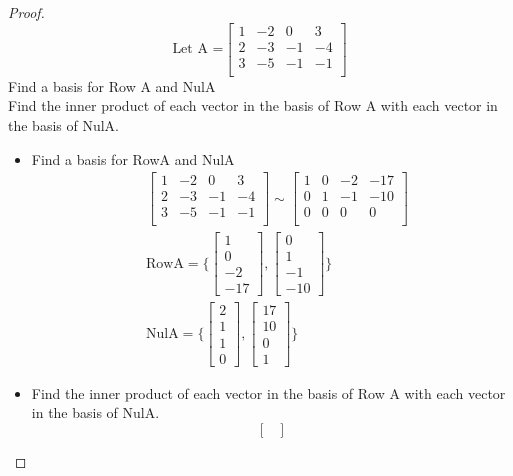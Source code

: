 \documentclass[12pt]{article}
\begin{document}
\begin{proof}
  \[
  \text{Let A =}
    \begin{bmatrix}
      1 &-2 &0 & 3\\
      2& -3 &-1 & -4\\
      3 & -5 & -1 & -1\\
    \end{bmatrix}
  \]
  Find a basis for Row A and NulA\\
  Find the inner product of each vector in the basis of Row A with each vector in the basis of NulA. \\
  \begin{itemize}
    \item Find a basis for RowA and NulA
    \begin{align*}
      &  \begin{bmatrix}
          1 &-2 &0 & 3\\
          2& -3 &-1 & -4\\
          3 & -5 & -1 & -1\\
        \end{bmatrix} \sim \begin{bmatrix}
            1 &0 &-2 & -17\\
            0& 1 &-1 & -10\\
            0 & 0 & 0 & 0\\
          \end{bmatrix} \\
        &\text{RowA}=\Bigg\{\begin{bmatrix}
          1\\0\\-2\\-17
      \end{bmatrix}
      ,\begin{bmatrix}
        0\\1\\-1\\-10
       \end{bmatrix}\Bigg\}\\
      &\text{NulA}=\Bigg\{\begin{bmatrix}
      2\\1\\1\\0
     \end{bmatrix}
     ,\begin{bmatrix}
      17\\10\\0\\1
    \end{bmatrix}\Bigg\}
    \end{align*}
    \item Find the inner product of each vector in the basis of Row A with each vector in the basis of NulA.
    \[
    \begin{bmatrix}


\end{bmatrix}\]
\end{itemize}
\end{proof}
\end{document}
